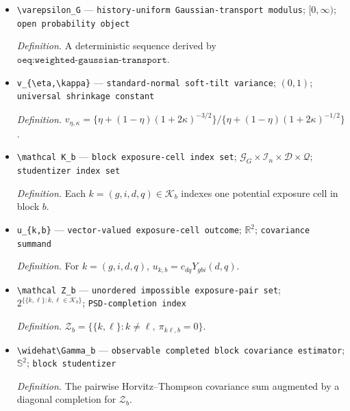 \documentclass{article}
\begin{document}
\begin{itemize}
  \par\smallskip\noindent\emph{Definition.} A centered Gaussian vector with the exact conditional \(P_0\)-covariance of \((R_b,W_b)\), supported on that covariance range when singular.
  \item \texttt{\textbackslash{}\allowbreak{}varepsilon\_\allowbreak{}G} --- \texttt{history-\allowbreak{}uniform Gaussian-\allowbreak{}transport modulus}; \([0,\infty)\); \texttt{open probability object}
  \par\smallskip\noindent\emph{Definition.} A deterministic sequence derived by \(\texttt{oeq:weighted-gaussian-transport}\).
  \item \texttt{v\_\allowbreak{}\{\textbackslash{}\allowbreak{}eta,\allowbreak{}\textbackslash{}\allowbreak{}kappa\}\allowbreak{}} --- \texttt{standard-\allowbreak{}normal soft-\allowbreak{}tilt variance}; \((0,1)\); \texttt{universal shrinkage constant}
  \par\smallskip\noindent\emph{Definition.} \(v_{\eta,\kappa}=\{\eta+(1-\eta)(1+2\kappa)^{-3/2}\}/\{\eta+(1-\eta)(1+2\kappa)^{-1/2}\}\).
  \item \texttt{\textbackslash{}\allowbreak{}mathcal K\_\allowbreak{}b} --- \texttt{block exposure-\allowbreak{}cell index set}; \(\mathcal G_G\times\mathcal I_n\times\mathcal D\times\mathcal Q\); \texttt{studentizer index set}
  \par\smallskip\noindent\emph{Definition.} Each \(k=(g,i,d,q)\in\mathcal K_b\) indexes one potential exposure cell in block \(b\).
  \item \texttt{u\_\allowbreak{}\{k,\allowbreak{}b\}\allowbreak{}} --- \texttt{vector-\allowbreak{}valued exposure-\allowbreak{}cell outcome}; \(\mathbb R^2\); \texttt{covariance summand}
  \par\smallskip\noindent\emph{Definition.} For \(k=(g,i,d,q)\), \(u_{k,b}=c_{dq}Y_{gbi}(d,q)\).
  \item \texttt{\textbackslash{}\allowbreak{}mathcal Z\_\allowbreak{}b} --- \texttt{unordered impossible exposure-\allowbreak{}pair set}; \(2^{\{\{k,\ell\}:k,\ell\in\mathcal K_b\}}\); \texttt{PSD-\allowbreak{}completion index}
  \par\smallskip\noindent\emph{Definition.} \(\mathcal Z_b=\{\{k,\ell\}:k\neq\ell,\ \pi_{k\ell,b}=0\}\).
  \item \texttt{\textbackslash{}\allowbreak{}widehat\textbackslash{}\allowbreak{}Gamma\_\allowbreak{}b} --- \texttt{observable completed block covariance estimator}; \(\mathbb S^2\); \texttt{block studentizer}
  \par\smallskip\noindent\emph{Definition.} The pairwise Horvitz--Thompson covariance sum augmented by a diagonal completion for \(\mathcal Z_b\).

\end{itemize}
\end{document}
